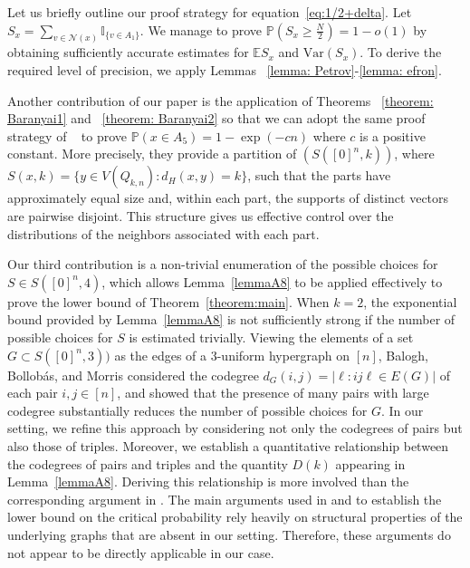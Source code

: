 \documentclass[reqno,11pt]{amsart}
\renewcommand{\geq}{\geqslant}
\begin{document}
Let us briefly outline our proof strategy for equation~\ref{eq:1/2+delta}. Let $S_x=\sum_{v \in \mathcal{N}(x)}\mathbb{I}_{\{v \in A_1\}}$. We manage to prove $\mathbb{P}(S_x \geq \frac{N}{2})=1-o(1)$ by obtaining sufficiently accurate estimates for  $\mathbb{E}S_x$ and $\text{Var}(S_x)$. To derive the required level of precision, we apply Lemmas ~\ref{lemma: Petrov}-\ref{lemma: efron}. 

Another contribution of our paper is the application of Theorems ~\ref{theorem: Baranyai1} and ~\ref{theorem: Baranyai2} so that we can adopt the same proof strategy of ~\cite{balogh_bollobas_morris_2009} to prove 
$\mathbb{P}(x \in A_5)=1-\exp(-cn)$ where $c$ is a positive constant. More precisely, they provide a partition of $(S([0]^n,k))$, where $S(x,k)=\{y\in V(Q_{k,n}): d_H(x,y)=k\}$, such that the parts have approximately equal size and, within each part, the supports of distinct vectors are pairwise disjoint. This structure gives us effective control over the distributions of the neighbors associated with each part. 


Our third contribution is a non-trivial enumeration of the possible choices for $S \in S([0]^n,4)$, which allows Lemma~\ref{lemmaA8} to be applied effectively to prove the lower bound of Theorem~\ref{theorem:main}. When $k=2$, the exponential bound provided by Lemma~\ref{lemmaA8} is not sufficiently strong if the number of possible choices for $S$ is estimated trivially. Viewing the elements of a set $G\subset S([0]^n,3))$ as the edges of a $3$-uniform hypergraph on $[n]$, Balogh, Bollob{\'a}s, and Morris \cite{balogh_bollobas_morris_2009} considered the codegree $d_G(i,j)=\bigl|{\ell: ij\ell\in E(G)}\bigr|$
of each pair $i,j\in[n]$, and showed that the presence of many pairs with large codegree substantially reduces the number of possible choices for $G$. In our setting, we refine this approach by considering not only the codegrees of pairs but also those of triples. Moreover, we establish a quantitative relationship between the codegrees of pairs and triples and the quantity $D(k)$ appearing in Lemma~\ref{lemmaA8}. Deriving this relationship is more involved than the corresponding argument in \cite{balogh_bollobas_morris_2009}. The main arguments used in \cite{collares2024universalbehaviourmajoritybootstrap} and \cite{COLLARES2026104347} to establish the lower bound on the critical probability rely heavily on structural properties of the underlying graphs that are absent in our setting. Therefore, these arguments do not appear to be directly applicable in our case.
\end{document}
